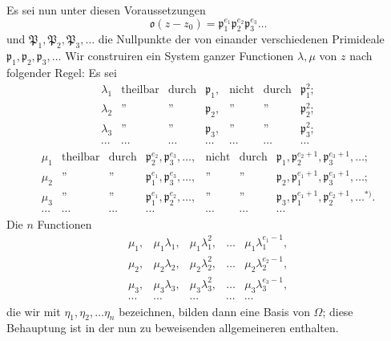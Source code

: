 \documentclass{article}
\begin{document}
Es sei nun unter diesen Voraussetzungen
\[ \mathfrak{o}(z-z_{0}) = \mathfrak{p}_{1}^{e_{1}}\mathfrak{p}_{2}^{e_{2}}\mathfrak{p}_{3}^{e_{3}}\ldots \]
und $\mathfrak{P}_{1}, \mathfrak{P}_{2}, \mathfrak{P}_{3}, \ldots$ die Nullpunkte der von einander verschiedenen Primideale $\mathfrak{p}_{1}, \mathfrak{p}_{2}, \mathfrak{p}_{3}, \ldots$ Wir construiren ein System ganzer Functionen $\lambda, \mu$ von $z$ nach folgender Regel: Es sei
\[ \begin{matrix} \lambda_{1} & \text{theilbar} & \text{durch} & \mathfrak{p}_{1}, & \text{nicht} & \text{durch} & \mathfrak{p}_{1}^{2}; \\ \lambda_{2} & \text{''} & \text{''} & \mathfrak{p}_{2}, & \text{''} & \text{''} & \mathfrak{p}_{2}^{2}; \\ \lambda_{3} & \text{''} & \text{''} & \mathfrak{p}_{3}, & \text{''} & \text{''} & \mathfrak{p}_{3}^{2}; \\ \cdots & \cdots & \cdots & \cdots & \cdots & \cdots & \cdots \end{matrix} \]
\[ \begin{matrix} \mu_{1} & \text{theilbar} & \text{durch} & \mathfrak{p}_{2}^{e_{2}}, \mathfrak{p}_{3}^{e_{3}}, \ldots, & \text{nicht} & \text{durch} & \mathfrak{p}_{1}, \mathfrak{p}_{2}^{e_{2}+1}, \mathfrak{p}_{3}^{e_{3}+1}, \ldots; \\ \mu_{2} & \text{''} & \text{''} & \mathfrak{p}_{1}^{e_{1}}, \mathfrak{p}_{3}^{e_{3}}, \ldots, & \text{''} & \text{''} & \mathfrak{p}_{2}, \mathfrak{p}_{1}^{e_{1}+1}, \mathfrak{p}_{3}^{e_{3}+1}, \ldots; \\ \mu_{3} & \text{''} & \text{''} & \mathfrak{p}_{1}^{e_{1}}, \mathfrak{p}_{2}^{e_{2}}, \ldots, & \text{''} & \text{''} & \mathfrak{p}_{3}, \mathfrak{p}_{1}^{e_{1}+1}, \mathfrak{p}_{2}^{e_{2}+1}, \ldots{}^{*)}. \\ \cdots & \cdots & \cdots & \cdots & \cdots & \cdots & \cdots \end{matrix} \]
Die $n$ Functionen
\[ \begin{matrix} \mu_{1}, & \mu_{1}\lambda_{1}, & \mu_{1}\lambda_{1}^{2}, & \ldots & \mu_{1}\lambda_{1}^{e_{1}-1}, \\ \mu_{2}, & \mu_{2}\lambda_{2}, & \mu_{2}\lambda_{2}^{2}, & \ldots & \mu_{2}\lambda_{2}^{e_{2}-1}, \\ \mu_{3}, & \mu_{3}\lambda_{3}, & \mu_{3}\lambda_{3}^{2}, & \ldots & \mu_{3}\lambda_{3}^{e_{3}-1}, \\ \cdots & \cdots & \cdots & \cdots & \cdots \end{matrix} \]
die wir mit $\eta_{1}, \eta_{2}, \ldots \eta_{n}$ bezeichnen, bilden dann eine Basis von $\Omega$; diese Behauptung ist in der nun zu beweisenden allgemeineren enthalten.
\end{document}
